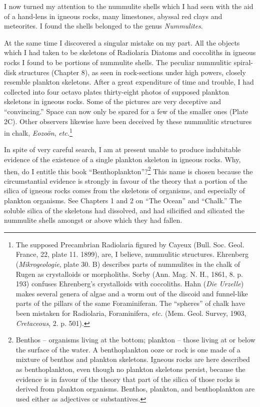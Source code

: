 \documentclass[a4paper, 12pt, oneside]{article}
\begin{document}
I now turned my attention to the nummulite shells which I had seen with the aid of a hand-lens in igneous rocks, many limestones, abyssal red clays and meteorites. I found the shells belonged to the genus \emph{Nummulites}.

At the same time I discovered a singular mistake on my part. All the objects which I had taken to be skeletons of Radiolaria Diatoms and coccoliths in igneous rocks I found to be portions of nummulite shells. The peculiar nummulitic spiral-disk structures (Chapter 8), as seen in rock-sections under high powers, closely resemble plankton skeletons. After a great expenditure of time and trouble, I had collected into four octavo plates thirty-eight photos of supposed plankton skeletons in igneous rocks. Some of the pictures are very deceptive and ``convincing.'' Space can now only be spared for a few of the smaller ones (Plate 2C). Other observers likewise have been deceived by these nummulitic structures in chalk, \emph{Eozoön}, \emph{etc.}\footnote{The supposed Precambrian Radiolaria figured by Cayeux (Bull. Soc. Geol. France, 22, plate 11. 1899), are, I believe, nummulitic structures. Ehrenberg (\emph{Mikrogeologie}, plate 30. B) describes parts of nummulites in the chalk of Rugen as crystalloids or morpholiths. Sorby (Ann. Mag. N. H., 1861, 8. p. 193) confuses Ehrenberg's crystalloids with coccoliths. Hahn (\emph{Die Urzelle}) makes several genera of algae and a worm out of the discoid and funnel-like parts of the pillars of the same Foraminiferan. The ``spheres'' of chalk have been mistaken for Radiolaria, Foraminifera, \emph{etc.} (Mem. Geol. Survey, 1903, \emph{Cretaceous}, 2. p. 501).}

In spite of very careful search, I am at present unable to produce indubitable evidence of the existence of a single plankton skeleton in igneous rocks. Why, then, do I entitle this book ``Benthoplankton''?\footnote{Benthos -- organisms living at the bottom; plankton -- those living at or below the surface of the water. A benthoplankton ooze or rock is one made of a mixture of benthos and plankton skeletons. Igneous rocks are here described as benthoplankton, even though no plankton skeletons persist, because the evidence is in favour of the theory that part of the silica of those rocks is derived from plankton organisms. Benthos, plankton, and benthoplankton are used either as adjectives or substantives.} This name is chosen because the circumstantial evidence is strongly in favour of the theory that a portion of the silica of igneous rocks comes from the skeletons of organisms, and especially of plankton organisms. See Chapters 1 and 2 on ``The Ocean'' and ``Chalk.'' The soluble silica of the skeletons had dissolved, and had silicified and silicated the nummulite shells amongst or above which they had fallen.
\end{document}
